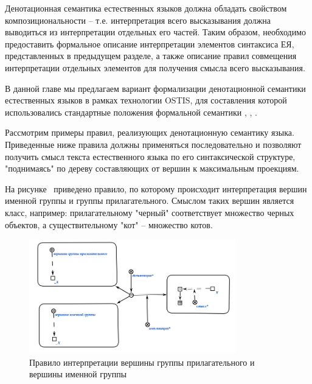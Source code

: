 Денотационная семантика естественных языков должна обладать свойством композициональности -- т.е. интерпретация всего высказывания должна выводиться из интерпретации отдельных его частей. Таким образом, необходимо предоставить формальное описание интерпретации элементов синтаксиса ЕЯ, представленных в предыдущем разделе, а также описание правил совмещения интерпретации отдельных элементов для получения смысла всего высказывания.

В данной главе мы предлагаем вариант формализации денотационной семантики естественных языков в рамках технологии OSTIS, для составления которой использовались стандартные положения формальной семантики , , .

Рассмотрим примеры правил, реализующих денотационную семантику языка. Приведенные ниже правила должны применяться последовательно и позволяют получить смысл текста естественного языка по его синтаксической структуре, "поднимаясь"{} по дереву составляющих от вершин к максимальным проекциям.

На рисунке~\textit{} приведено правило, по которому происходит интерпретация вершин именной группы и группы прилагательного.
Смыслом таких вершин является класс, например: прилагательному "черный"{} соответствует множество черных объектов, а существительному "кот"{} -- множество котов.

\begin{figure}[H]
    \centering
    \includegraphics[width=0.8\textwidth]{images/part2/chapter_lang/d_sem_1}
    \caption{Правило интерпретации вершины группы прилагательного и вершины именной группы}
    \label{fig:d_sem_1}
\end{figure}

